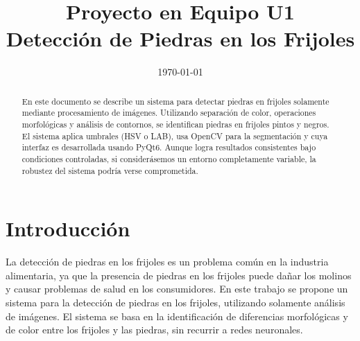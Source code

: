 \documentclass[conference]{IEEEtran}
\date{\specialdate\today}
\begin{document}
\newcommand{\breite}{0.9} %
\newcommand{\RelacionFiguradoscolumnas}{0.9}
\newcommand{\RelacionFiguradoscolumnasPuntoCinco}{0.45}

\title{Proyecto en Equipo U1 \\ Detección de Piedras en los Frijoles}

\author{
}

\maketitle

\begin{abstract} 
    En este documento se describe un sistema para detectar piedras en frijoles solamente mediante procesamiento de imágenes. Utilizando separación de color, operaciones morfológicas y análisis de contornos, se identifican piedras en frijoles pintos y negros. El sistema aplica umbrales (HSV o LAB), usa OpenCV para la segmentación y cuya interfaz es desarrollada usando PyQt6. Aunque logra resultados consistentes bajo condiciones controladas, si considerásemos un entorno completamente variable, la robustez del sistema podría verse comprometida.
\end{abstract}

\section{Introducción}
    La detección de piedras en los frijoles es un problema común en la industria alimentaria, ya que la presencia de piedras en los frijoles puede dañar los molinos y causar problemas de salud en los consumidores. En este trabajo se propone un sistema para la detección de piedras en los frijoles, utilizando solamente análisis de imágenes. El sistema se basa en la identificación de diferencias morfológicas y de color entre los frijoles y las piedras, sin recurrir a redes neuronales. 
    
\end{document}
